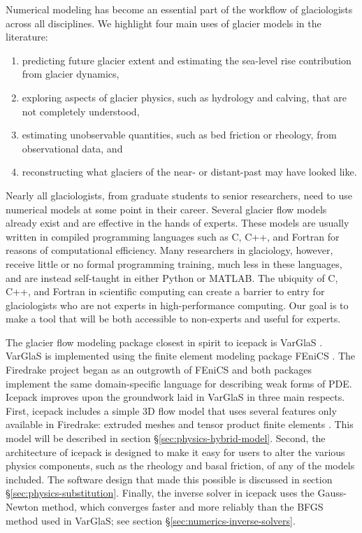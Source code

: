 \documentclass{article}
\theoremstyle{definition}
\theoremstyle{plain}
\begin{document}
Numerical modeling has become an essential part of the workflow of glaciologists across all disciplines.
We highlight four main uses of glacier models in the literature:
\begin{enumerate}
    \item predicting future glacier extent and estimating the sea-level rise contribution from glacier dynamics,
    \item exploring aspects of glacier physics, such as hydrology and calving, that are not completely understood,
    \item estimating unobservable quantities, such as bed friction or rheology, from observational data, and
    \item reconstructing what glaciers of the near- or distant-past may have looked like.
\end{enumerate}
Nearly all glaciologists, from graduate students to senior researchers, need to use numerical models at some point in their career.
Several glacier flow models already exist and are effective in the hands of experts.
These models are usually written in compiled programming languages such as C, C++, and Fortran for reasons of computational efficiency.
Many researchers in glaciology, however, receive little or no formal programming training, much less in these languages, and are instead self-taught in either Python or MATLAB.
The ubiquity of C, C++, and Fortran in scientific computing can create a barrier to entry for glaciologists who are not experts in high-performance computing.
Our goal is to make a tool that will be both accessible to non-experts and useful for experts.

The glacier flow modeling package closest in spirit to icepack is VarGlaS \citep{brinkerhoff2013data}.
VarGlaS is implemented using the finite element modeling package FEniCS \citep{logg2012automated}.
The Firedrake project began as an outgrowth of FEniCS and both packages implement the same domain-specific language for describing weak forms of PDE.
Icepack improves upon the groundwork laid in VarGlaS in three main respects.
First, icepack includes a simple 3D flow model that uses several features only available in Firedrake: extruded meshes and tensor product finite elements \citep{bercea2016structure, mcrae2016automated}.
This model will be described in section \S\ref{sec:physics-hybrid-model}.
Second, the architecture of icepack is designed to make it easy for users to alter the various physics components, such as the rheology and basal friction, of any of the models included.
The software design that made this possible is discussed in section \S\ref{sec:physics-substitution}.
Finally, the inverse solver in icepack uses the Gauss-Newton method, which converges faster and more reliably than the BFGS method used in VarGlaS; see section \S\ref{sec:numerics-inverse-solvers}.
\end{document}
